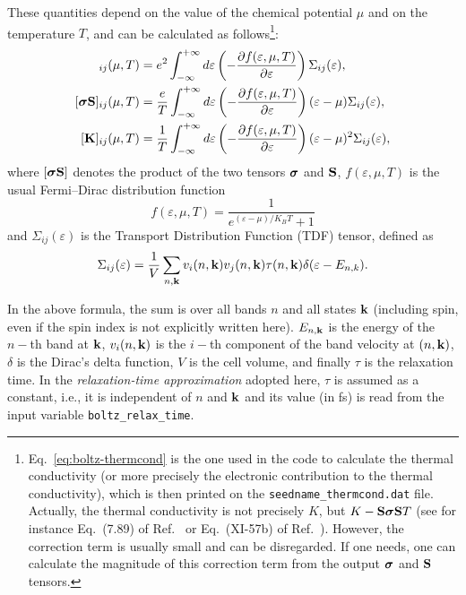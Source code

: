 These quantities depend on the value of the chemical potential $\mu$ and on the temperature $T$, and can be calculated as follows\footnote{\label{ftn:thermcond}%
Eq.~\eqref{eq:boltz-thermcond} is the one used in the code to calculate the thermal conductivity (or more precisely the electronic contribution to the thermal conductivity), which is then printed on the {\tt seedname\_thermcond.dat} file.
Actually, the thermal conductivity is not precisely $K$, but  $K-\bm{\mathrm{S}} \bm{\mathrm{\sigma}} \bm{\mathrm{S}} T$ (see for instance Eq.~(7.89) of Ref.~\cite{Ziman} or Eq.~(XI-57b) of Ref.~\cite{Grosso}).
However, the correction term is usually small and can be disregarded.
If one needs, one can calculate the magnitude of this correction term from the
output $\bm{\mathrm{\sigma}}$ and $\bm{\mathrm{S}}$ tensors.}:
\begin{align}
  [\bvec \sigma]_{ij}(\mu,T)&=e^2 \int_{-\infty}^{+\infty} d\varepsilon \left(-\frac {\partial f(\varepsilon,\mu,T)}{\partial \varepsilon}\right)\Sigma_{ij}(\varepsilon), \\
  [\bvec \sigma \bvec S]_{ij}(\mu,T)&=\frac e T \int_{-\infty}^{+\infty} d\varepsilon \left(-\frac {\partial f(\varepsilon,\mu,T)}{\partial \varepsilon}\right)(\varepsilon-\mu)\Sigma_{ij}(\varepsilon), \\
  [\bvec K]_{ij}(\mu,T)&=\frac 1 T \int_{-\infty}^{+\infty} d\varepsilon \left(-\frac {\partial f(\varepsilon,\mu,T)}{\partial \varepsilon}\right)(\varepsilon-\mu)^2 \Sigma_{ij}(\varepsilon),\label{eq:boltz-thermcond}
\end{align}
where $[\bm{\mathrm{\sigma}} \bm{\mathrm{S}}]$ denotes the product of the two tensors $\bm{\mathrm{\sigma}}$ and $\bm{\mathrm{S}}$, $f(\varepsilon,\mu,T)$ is the usual Fermi--Dirac distribution function 
\begin{equation*}
  f(\varepsilon,\mu,T) = \frac{1}{e^{(\varepsilon-\mu)/K_B T}+1}
\end{equation*}
and $\Sigma_{ij}(\varepsilon)$ is the Transport Distribution Function (TDF) tensor, defined as
\begin{equation*}
  \Sigma_{ij}(\varepsilon) = \frac 1 V \sum_{n,\bm{\mathrm{k}}} v_i(n,\bm{\mathrm{k}}) v_j(n,\bm{\mathrm{k}}) \tau(n,\bm{\mathrm{k}}) \delta(\varepsilon - E_{n,k}).
\end{equation*}

In the above formula, the sum is over all bands $n$ and all states $\bm{\mathrm{k}}$ (including spin, even if the spin index is not explicitly written here). $E_{n,\bm{\mathrm{k}}}$ is the energy of the $n-$th band at $\bm{\mathrm{k}}$, $v_i(n,\bm{\mathrm{k}})$ is the $i-$th component of the band velocity at $(n,\bm{\mathrm{k}})$, $\delta$ is the Dirac's delta function, $V$ is the cell volume, and finally $\tau$ is the relaxation time. In the \emph{relaxation-time approximation} adopted here, $\tau$ is assumed as a constant, i.e., it is independent of $n$ and $\bm{\mathrm{k}}$ and its value (in fs) is read from the input variable \verb#boltz_relax_time#.

